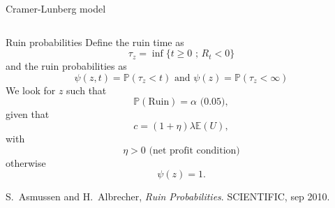 \documentclass{beamer}
\begin{document}
\begin{frame}{Cramer-Lunberg model}
\begin{columns}
\begin{column}{0.5\textwidth}
\end{column}
\end{columns}

\end{frame}
\begin{frame}{Ruin probabilities}
\scriptsize
Define the ruin time as 
$$
\tau_z = \inf\{t\geq0\text{ ; }R_t <0\}
$$
and the ruin probabilities as 
$$
\psi(z,t) = \mathbb{P}(\tau_z < t)\text{ and }\psi(z) = \mathbb{P}(\tau_z < \infty)
$$
We look for $z$ such that 
$$
\mathbb{P}(\text{Ruin}) = \alpha\text{ (0.05)},
$$
given that 
$$
c=(1+\eta)\lambda\mathbb{E}(U),
$$
with 
$$\eta>0\text{ (net profit condition)}$$  
otherwise 
$$\psi(z)=1.$$

\tiny
\begin{thebibliography}{1}

S.~Asmussen and H.~Albrecher, {\em Ruin Probabilities}.
 {SCIENTIFIC}, sep 2010.

\end{thebibliography}

\end{frame}
\end{document}
